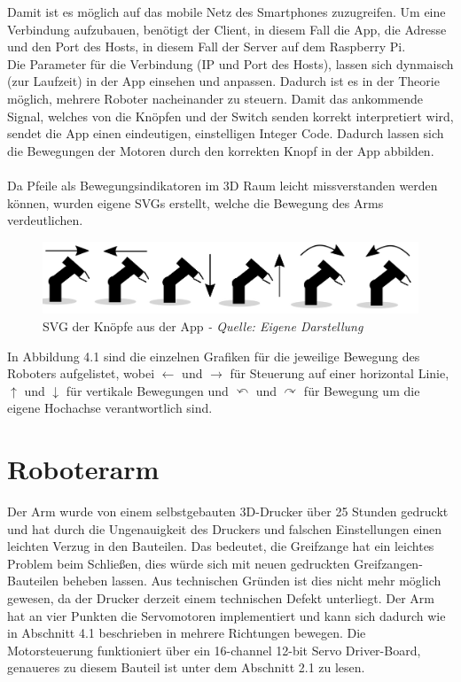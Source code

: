 \documentclass[12pt,					%
							 oneside,			%
							 a4paper,			%
							 halfparskip,		%
							 liststotoc,			%
							 bibtotoc,			%
							 fleqn,				%
							 pointlessnumbers]	%
							 {scrreprt}
\begin{document}
Damit ist es möglich auf das mobile Netz des Smartphones zuzugreifen. Um eine Verbindung aufzubauen, benötigt der Client, in diesem Fall die App, die Adresse und den Port des Hosts, in diesem Fall der Server auf dem Raspberry Pi. \\
Die Parameter für die Verbindung (IP und Port des Hosts), lassen sich dynmaisch (zur Laufzeit) in der App einsehen und anpassen. Dadurch ist es in der Theorie möglich, mehrere Roboter nacheinander zu steuern. 
Damit das ankommende Signal, welches von die Knöpfen und der Switch senden korrekt interpretiert wird, sendet die App einen eindeutigen, einstelligen Integer Code. Dadurch lassen sich die Bewegungen der Motoren durch den korrekten Knopf in der App abbilden. \\ \\
Da Pfeile als Bewegungsindikatoren im 3D Raum leicht missverstanden werden können, wurden eigene SVGs erstellt, welche die Bewegung des Arms verdeutlichen. \\
\begin{figure}[h]
	\centering
	\includegraphics[scale=0.3]{pictures/robissvg.jpg}
	\caption{SVG der Knöpfe aus der App \textit{- Quelle: Eigene Darstellung}}
\end{figure}
\newpage
In Abbildung 4.1 sind die einzelnen Grafiken für die jeweilige Bewegung des Roboters aufgelistet, wobei $\leftarrow$ und $\rightarrow$ für Steuerung auf einer horizontal Linie, $\uparrow$ und $\downarrow$ für vertikale Bewegungen und $\curvearrowleft$ und $\curvearrowright$ für Bewegung um die eigene Hochachse verantwortlich sind.

\section{Roboterarm}
Der Arm wurde von einem selbstgebauten 3D-Drucker über 25 Stunden gedruckt und hat durch die Ungenauigkeit des Druckers und falschen Einstellungen einen leichten Verzug in den Bauteilen. Das bedeutet, die Greifzange hat ein leichtes Problem beim Schließen, dies würde sich mit neuen gedruckten Greifzangen-Bauteilen beheben lassen. Aus technischen Gründen ist dies nicht mehr möglich gewesen, da der Drucker derzeit einem technischen Defekt unterliegt.
Der Arm hat an vier Punkten die Servomotoren implementiert und kann sich dadurch wie in Abschnitt 4.1 beschrieben in mehrere Richtungen bewegen. Die Motorsteuerung funktioniert über ein 16-channel 12-bit Servo Driver-Board, genaueres zu diesem Bauteil ist unter dem Abschnitt 2.1 zu lesen.
\newpage
\end{document}
